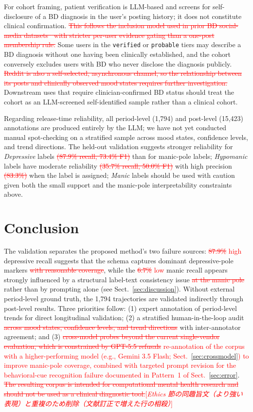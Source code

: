 \documentclass[runningheads]{llncs}
\newcommand{\rev}[1]{\textcolor{red}{#1}}
\newcommand{\del}[1]{\textcolor{red}{\sout{#1}}}
\newcommand{\dnote}[1]{\textcolor{red}{[\textit{#1}]}}
\newcommand{\rev}[1]{#1}
\newcommand{\del}[1]{}
\newcommand{\dnote}[1]{}
\begin{document}
For cohort framing, patient verification is LLM-based and screens for self-disclosure of a BD diagnosis in the user's posting history; it does not constitute clinical confirmation. \del{This follows the inclusion model used in prior BD social-media datasets~\cite{jagfeld2021understanding,sekulic2018not} with stricter per-user evidence gating than a one-post membership rule.} Some users in the \texttt{verified} or \texttt{probable} tiers may describe a BD diagnosis without one having been clinically established, and the cohort conversely excludes users with BD who never disclose the diagnosis publicly. \del{Reddit is also a self-selected, asynchronous channel, so the relationship between its posts and clinically observed mood states requires further investigation.} Downstream uses that require clinician-confirmed BD status should treat the cohort as an LLM-screened self-identified sample rather than a clinical cohort.

Regarding release-time reliability, all period-level (1,794) and post-level (15,423) annotations are produced entirely by the LLM; we have not yet conducted manual spot-checking on a stratified sample across mood states, confidence levels, and trend directions. The held-out validation suggests stronger reliability for \emph{Depressive} labels\del{ (87.9\% recall, 73.4\% F1)} than for manic-pole labels; \emph{Hypomanic} labels have moderate reliability\del{ (35.7\% recall, 50.0\% F1)} with high precision\del{ (83.3\%)} when the label is assigned; \emph{Manic} labels should be used with caution given both the small support and the manic-pole interpretability constraints above.

\section{Conclusion}

The validation separates the proposed method's two failure sources: \del{87.9\%} \rev{high} depressive recall suggests that the schema captures dominant depressive-pole markers\del{ with reasonable coverage}, while the \del{6.7\%} \rev{low} manic recall appears strongly influenced by a structural label-text consistency issue\del{ at the manic pole} rather than by prompting alone (see Sect.~\ref{sec:discussion}). Without external period-level ground truth, the 1,794 trajectories are validated indirectly through post-level results. Three priorities follow: (1) expert annotation of period-level trends for direct longitudinal validation; (2) a stratified human-in-the-loop audit\del{ across mood states, confidence levels, and trend directions} with inter-annotator agreement; and (3) \del{cross-model probes beyond the current single-vendor evaluation, which is constrained by GPT-5.5 refusals} \rev{re-annotation of the corpus with a higher-performing model (e.g., Gemini 3.5 Flash; Sect.~\ref{sec:crossmodel}) to improve manic-pole coverage, combined with targeted prompt revision for the behavioral-cue recognition failure documented in Pattern~1 of Sect.~\ref{sec:error}}.\del{ The resulting corpus is intended for computational mental health research and should not be used as a clinical diagnostic tool.}\dnote{Ethics 節の同趣旨文（より強い表現）と重複のため削除（文献訂正で増えた行の相殺）}
\end{document}
